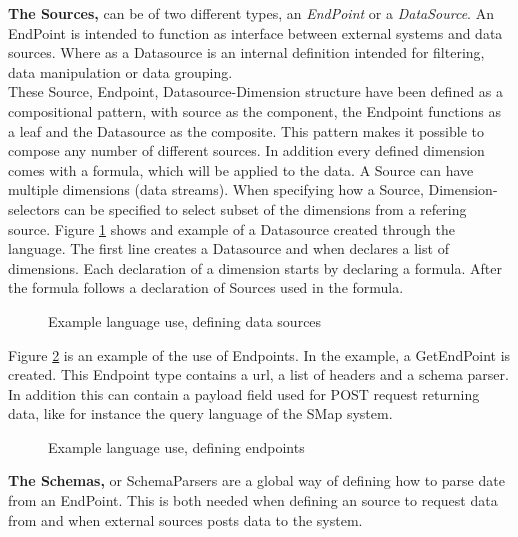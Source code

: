 \textbf{The Sources, } can be of two different types, an \textit{EndPoint} or a \textit{DataSource}.
An EndPoint is intended to function as interface between external systems and data sources. 
Where as a Datasource is an internal definition intended for filtering, data manipulation or
data grouping.\\
These Source, Endpoint, Datasource-Dimension structure have been defined as a compositional
pattern, with source as the component, the Endpoint functions as a leaf and
the Datasource as the composite.
This pattern makes it possible to compose any number of different sources.
In addition every defined dimension comes with a formula, which will be applied to the data.
A Source can have multiple dimensions (data streams). When specifying how a Source,
Dimension-selectors can be specified to select subset of the dimensions from a refering source.
Figure \ref{fig:exampleDatasources} shows and example of a Datasource created through the
language. 
The first line creates a Datasource and when declares a list of dimensions. 
Each declaration of a dimension starts by declaring a formula. After the formula follows a
declaration of Sources used in the formula. 

\begin{figure}
\begin{center}

\end{center}
\caption{Example language use, defining data sources}
\label{fig:exampleDatasources}
\end{figure}

Figure \ref{fig:exampleEndpoints} is an example of the use of Endpoints.
In the example, a GetEndPoint is created. This Endpoint type contains a url, a list of headers
and a schema parser.
In addition this can contain a payload field used for POST request returning data, like for
instance the query language of the SMap system.
\begin{figure}
\begin{center}

\end{center}
\caption{Example language use, defining endpoints}
\label{fig:exampleEndpoints}
\end{figure}

\textbf{The Schemas,} or SchemaParsers are a global way of defining how to parse date from an
EndPoint.
This is both needed when defining an source to request data from and when external sources posts
data to the system.

